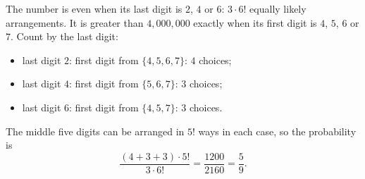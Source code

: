 The number is even when its last digit is $2$, $4$ or $6$: $3\cdot6!$ equally likely arrangements. It is greater than $4{,}000{,}000$ exactly when its first digit is $4$, $5$, $6$ or $7$. Count by the last digit:
\begin{itemize}
\item last digit $2$: first digit from $\{4,5,6,7\}$: $4$ choices;
\item last digit $4$: first digit from $\{5,6,7\}$: $3$ choices;
\item last digit $6$: first digit from $\{4,5,7\}$: $3$ choices.
\end{itemize}
The middle five digits can be arranged in $5!$ ways in each case, so the probability is
\[\dfrac{(4+3+3)\cdot5!}{3\cdot6!}=\dfrac{1200}{2160}=\boxed{\dfrac59}.\]
